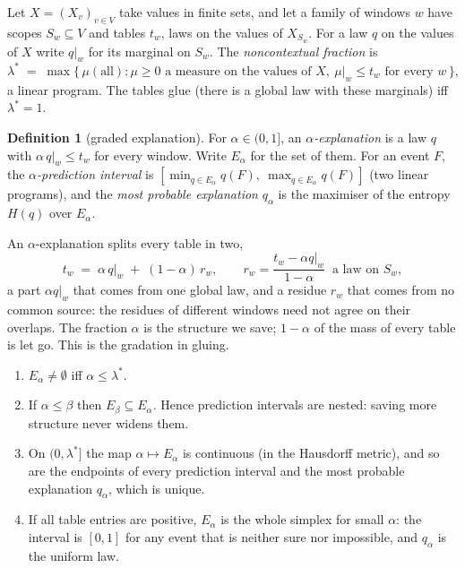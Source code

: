 \documentclass[11pt]{article}
\theoremstyle{definition}\newtheorem{definition}[theorem]{Definition}\newtheorem{remark}[theorem]{Remark}\newtheorem{example}[theorem]{Example}
\begin{document}
Let $X=(X_v)_{v\in V}$ take values in finite sets, and let a family of windows $w$ have scopes $S_w\subseteq V$ and tables $t_w$, laws on
the values of $X_{S_w}$. For a law $q$ on the values of $X$ write $q|_w$ for its marginal on $S_w$. The \emph{noncontextual fraction}
\cite{AbramskyBarbosaMansfield2017} is
\[
  \lambda^* \;=\; \max\{\,\mu(\text{all}) : \mu\ge 0 \text{ a measure on the values of } X,\ \mu|_w\le t_w \text{ for every } w\,\},
\]
a linear program. The tables glue (there is a global law with these marginals) iff $\lambda^*=1$.

\begin{definition}[graded explanation]
For $\alpha\in(0,1]$, an \emph{$\alpha$-explanation} is a law $q$ with $\alpha\, q|_w\le t_w$ for every window. Write $E_\alpha$ for the
set of them. For an event $F$, the \emph{$\alpha$-prediction interval} is $[\min_{q\in E_\alpha} q(F),\ \max_{q\in E_\alpha}q(F)]$
(two linear programs), and the \emph{most probable explanation} $q_\alpha$ is the maximiser of the entropy $H(q)$ over $E_\alpha$.
\end{definition}

An $\alpha$-explanation splits every table in two,
\begin{equation}\label{eq:split}
  t_w \;=\; \alpha\, q|_w \;+\; (1-\alpha)\, r_w, \qquad r_w=\frac{t_w-\alpha q|_w}{1-\alpha}\ \text{ a law on } S_w ,
\end{equation}
a part $\alpha q|_w$ that comes from one global law, and a residue $r_w$ that comes from no common source: the residues of different windows
need not agree on their overlaps. The fraction $\alpha$ is the structure we save; $1-\alpha$ of the mass of every table is let go. This is
the gradation in gluing.

\begin{proposition}\label{prop:graded}
\begin{enumerate}[label=(\roman*),leftmargin=*,itemsep=1pt]
\item $E_\alpha\neq\emptyset$ iff $\alpha\le\lambda^*$.
\item If $\alpha\le\beta$ then $E_\beta\subseteq E_\alpha$. Hence prediction intervals are nested: saving more structure never widens
them.
\item On $(0,\lambda^*]$ the map $\alpha\mapsto E_\alpha$ is continuous (in the Hausdorff metric), and so are the endpoints of every
prediction interval and the most probable explanation $q_\alpha$, which is unique.
\item If all table entries are positive, $E_\alpha$ is the whole simplex for small $\alpha$: the interval is $[0,1]$ for any event that is
neither sure nor impossible, and $q_\alpha$ is the uniform law.
\end{enumerate}
\end{proposition}
\end{document}
